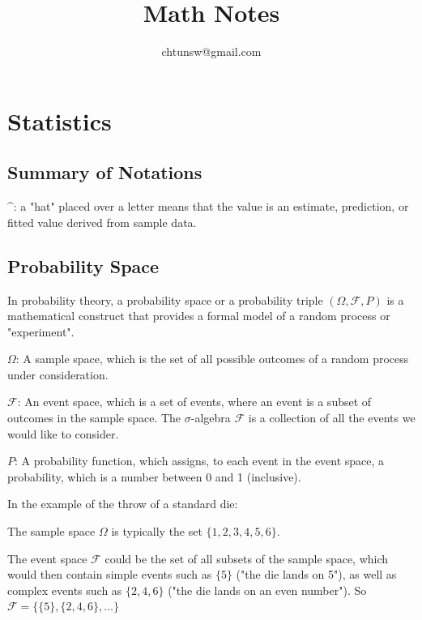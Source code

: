 \documentclass{article}
\title{Math Notes}
\author{chtunsw@gmail.com}
\date{}
\begin{document}
\maketitle

\clearpage

\tableofcontents{}

\clearpage

\section{Statistics}

\subsection{Summary of Notations}

\textasciicircum: a "hat" placed over a letter means that the value is an estimate, prediction, or fitted value derived from sample data.

\subsection{Probability Space}

In probability theory, a probability space or a probability triple \((\Omega, \mathcal{F}, P)\) is a mathematical construct that provides a formal model of a random process or "experiment".

\(\Omega\): A sample space, which is the set of all possible outcomes of a random process under consideration.

\(\mathcal{F}\): An event space, which is a set of events, where an event is a subset of outcomes in the sample space. The \(\sigma\)-algebra 
\(\mathcal{F}\) is a collection of all the events we would like to consider.

\(P\): A probability function, which assigns, to each event in the event space, a probability, which is a number between 0 and 1 (inclusive).

In the example of the throw of a standard die:

The sample space  \(\Omega\) is typically the set \(\{1, 2, 3, 4, 5, 6\}\). 

The event space \(\mathcal{F}\) could be the set of all subsets of the sample space, 
which would then contain simple events such as \(\{5\}\) ("the die lands on 5"),
as well as complex events such as \(\{2, 4, 6\}\) ("the die lands on an even number"). 
So \(\mathcal{F} = \{\{5\}, \{2, 4, 6\}, \dots\}\)
\end{document}

